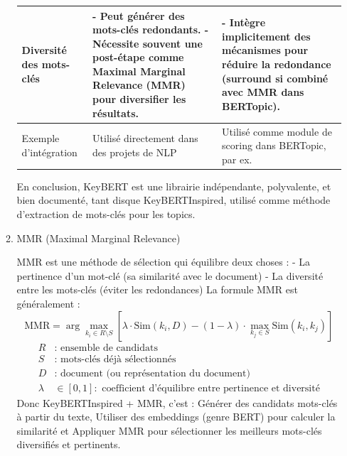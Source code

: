 \documentclass[mstat,12pt]{unswthesis}
\begin{document}
\begin{enumerate}
\begin{enumerate}
\begin{table}[H]
\begin{tabular}{|p{3cm}|p{5cm}|p{5cm}|}
                \hline
                Diversité des mots-clés & - Peut générer des mots-clés redondants. - Nécessite souvent une post-étape comme Maximal Marginal Relevance (MMR) pour diversifier les résultats. & - Intègre implicitement des mécanismes pour réduire la redondance (surround si combiné avec MMR dans BERTopic). \\
                \hline
                Exemple d'intégration & Utilisé directement dans des projets de NLP & Utilisé comme module de scoring dans BERTopic, par ex. \\
                \hline
            \end{tabular}
            \label{tab:keybert_vs_keybertinspired}
        
        \end{table}

        En conclusion, KeyBERT est une librairie indépendante, polyvalente, et bien documenté,
        tant disque KeyBERTInspired, utilisé comme méthode d’extraction de mots-clés pour les
        topics.

        \bigskip

        \item MMR (Maximal Marginal Relevance)

        \bigskip

        MMR est une méthode de sélection qui équilibre deux choses :
        - La pertinence d’un mot-clé (sa similarité avec le document)
        - La diversité entre les mots-clés (éviter les redondances)
        La formule MMR est généralement :
        \[
        \text{MMR} = \arg\max_{k_i \in R \setminus S} \left[
        \lambda \cdot \text{Sim}(k_i, D) - (1 - \lambda) \cdot \max_{k_j \in S} \text{Sim}(k_i, k_j)
        \right]
        \]
        \begin{align*}
        R &: \text{ ensemble de candidats} \\
        S &: \text{ mots-clés déjà sélectionnés} \\
        D &: \text{ document (ou représentation du document)} \\
        \lambda &\in [0, 1] : \text{ coefficient d’équilibre entre pertinence et diversité}
        \end{align*}
        Donc KeyBERTInspired + MMR, c’est :
        Générer des candidats mots-clés à partir du texte, Utiliser des embeddings (genre BERT)
        pour calculer la similarité et Appliquer MMR pour sélectionner les meilleurs mots-clés
        diversifiés et pertinents.
        

\end{enumerate}
\end{enumerate}
\end{document}
